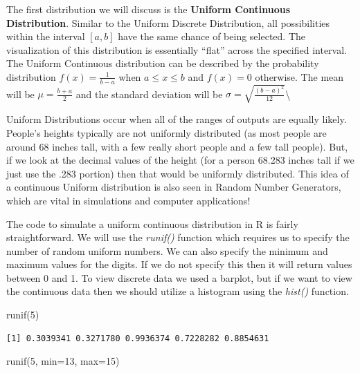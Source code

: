 \documentclass[
  letterpaper,
  DIV=11,
  numbers=noendperiod]{scrreprt}
\newenvironment{Shaded}{\begin{snugshade}}{\end{snugshade}}
\newcommand{\AttributeTok}[1]{\textcolor[rgb]{0.40,0.45,0.13}{#1}}
\newcommand{\DecValTok}[1]{\textcolor[rgb]{0.68,0.00,0.00}{#1}}
\newcommand{\FunctionTok}[1]{\textcolor[rgb]{0.28,0.35,0.67}{#1}}
\newcommand{\NormalTok}[1]{\textcolor[rgb]{0.00,0.23,0.31}{#1}}
\begin{document}
The first distribution we will discuss is the \textbf{Uniform Continuous
Distribution}. Similar to the Uniform Discrete Distribution, all
possibilities within the interval \([a,b]\) have the same chance of
being selected. The visualization of this distribution is essentially
``flat'' across the specified interval. The Uniform Continuous
distribution can be described by the probability distribution
\(f(x)=\frac{1}{b-a}\) when \(a\leq x \leq b\) and \(f(x)=0\) otherwise.
The mean will be \(\mu=\frac{b+a}{2}\) and the standard deviation will
be \(\sigma = \sqrt{\frac{(b-a)^2}{12}}\)\textbackslash{}

Uniform Distributions occur when all of the ranges of outputs are
equally likely. People's heights typically are not uniformly distributed
(as most people are around 68 inches tall, with a few really short
people and a few tall people). But, if we look at the decimal values of
the height (for a person 68.283 inches tall if we just use the .283
portion) then that would be uniformly distributed. This idea of a
continuous Uniform distribution is also seen in Random Number
Generators, which are vital in simulations and computer applications!

The code to simulate a uniform continuous distribution in R is fairly
straightforward. We will use the \emph{runif()} function which requires
us to specify the number of random uniform numbers. We can also specify
the minimum and maximum values for the digits. If we do not specify this
then it will return values between 0 and 1. To view discrete data we
used a barplot, but if we want to view the continuous data then we
should utilize a histogram using the \emph{hist()} function.

\begin{Shaded}
\begin{Highlighting}[]
\FunctionTok{runif}\NormalTok{(}\DecValTok{5}\NormalTok{)}
\end{Highlighting}
\end{Shaded}

\begin{verbatim}
[1] 0.3039341 0.3271780 0.9936374 0.7228282 0.8854631
\end{verbatim}

\begin{Shaded}
\begin{Highlighting}[]
\FunctionTok{runif}\NormalTok{(}\DecValTok{5}\NormalTok{, }\AttributeTok{min=}\DecValTok{13}\NormalTok{, }\AttributeTok{max=}\DecValTok{15}\NormalTok{)}
\end{Highlighting}
\end{Shaded}
\end{document}
